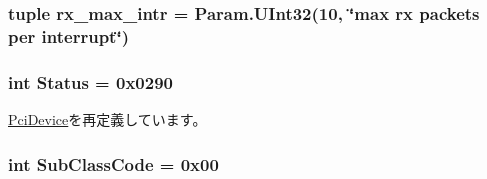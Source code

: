 \label{classEthernet_1_1Sinic_ab20f207dc9ec8ac2c424b651a3db2d22}
\hypertarget{classEthernet_1_1Sinic_aff1ea6b2b9961b9f27e19278447c704a}{
\subsubsection[{rx\_\-max\_\-intr}]{\setlength{\rightskip}{0pt plus 5cm}tuple {\bf rx\_\-max\_\-intr} = Param.UInt32(10, \char`\"{}max rx packets per interrupt\char`\"{})}}
\label{classEthernet_1_1Sinic_aff1ea6b2b9961b9f27e19278447c704a}
\hypertarget{classEthernet_1_1Sinic_ae58c2415cf1178457fa1254234c3f017}{
\subsubsection[{Status}]{\setlength{\rightskip}{0pt plus 5cm}int {\bf Status} = 0x0290}}
\label{classEthernet_1_1Sinic_ae58c2415cf1178457fa1254234c3f017}


\hyperlink{classPci_1_1PciDevice_aba3540dcad58fc3d3042791b42b96b98}{PciDevice}を再定義しています。\hypertarget{classEthernet_1_1Sinic_a6537e94b8ab06acd357673ec1699adc8}{
\subsubsection[{SubClassCode}]{\setlength{\rightskip}{0pt plus 5cm}int {\bf SubClassCode} = 0x00}}
\label{classEthernet_1_1Sinic_a6537e94b8ab06acd357673ec1699adc8}


